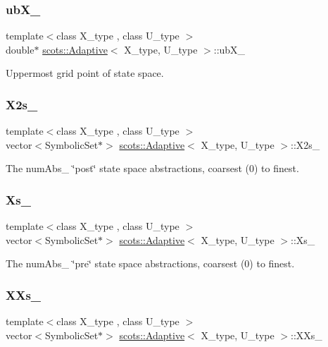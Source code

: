 \subsubsection{\texorpdfstring{ub\+X\+\_\+}{ubX\_}}
{\footnotesize\ttfamily template$<$class X\+\_\+type , class U\+\_\+type $>$ \\
double$\ast$ \hyperlink{classscots_1_1Adaptive}{scots\+::\+Adaptive}$<$ X\+\_\+type, U\+\_\+type $>$\+::ub\+X\+\_\+}

Uppermost grid point of state space. \mbox{\label{classscots_1_1Adaptive_a532d1acf3db0235c7bbd551b41a040fc}} 
\subsubsection{\texorpdfstring{X2s\+\_\+}{X2s\_}}
{\footnotesize\ttfamily template$<$class X\+\_\+type , class U\+\_\+type $>$ \\
vector$<$Symbolic\+Set$\ast$$>$ \hyperlink{classscots_1_1Adaptive}{scots\+::\+Adaptive}$<$ X\+\_\+type, U\+\_\+type $>$\+::X2s\+\_\+}

The num\+Abs\+\_\+ \char`\"{}post\char`\"{} state space abstractions, coarsest (0) to finest. \mbox{\label{classscots_1_1Adaptive_ae43471177bc6b7d3229a9497b46ee343}} 
\subsubsection{\texorpdfstring{Xs\+\_\+}{Xs\_}}
{\footnotesize\ttfamily template$<$class X\+\_\+type , class U\+\_\+type $>$ \\
vector$<$Symbolic\+Set$\ast$$>$ \hyperlink{classscots_1_1Adaptive}{scots\+::\+Adaptive}$<$ X\+\_\+type, U\+\_\+type $>$\+::Xs\+\_\+}

The num\+Abs\+\_\+ \char`\"{}pre\char`\"{} state space abstractions, coarsest (0) to finest. \mbox{\label{classscots_1_1Adaptive_a3c52621889e3ea22c888c93cd14e5a76}} 
\subsubsection{\texorpdfstring{X\+Xs\+\_\+}{XXs\_}}
{\footnotesize\ttfamily template$<$class X\+\_\+type , class U\+\_\+type $>$ \\
vector$<$Symbolic\+Set$\ast$$>$ \hyperlink{classscots_1_1Adaptive}{scots\+::\+Adaptive}$<$ X\+\_\+type, U\+\_\+type $>$\+::X\+Xs\+\_\+}

